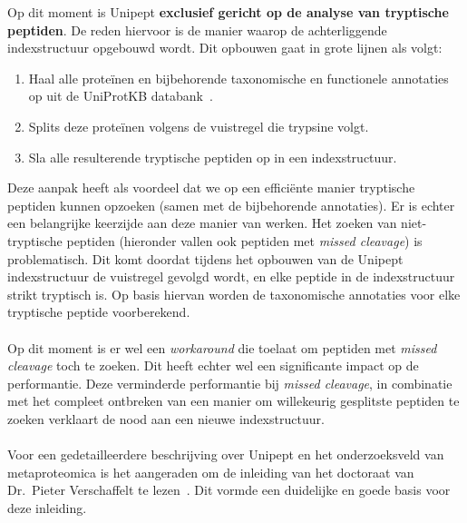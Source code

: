 Op dit moment is Unipept \textbf{exclusief gericht op de analyse van tryptische peptiden}.
De reden hiervoor is de manier waarop de achterliggende indexstructuur opgebouwd wordt.
Dit opbouwen gaat in grote lijnen als volgt:

\begin{enumerate}
    \item Haal alle proteïnen en bijbehorende taxonomische en functionele annotaties op uit de UniProtKB databank~\cite{UniprotKB}.
    \item Splits deze proteïnen volgens de vuistregel die trypsine volgt.
    \item Sla alle resulterende tryptische peptiden op in een indexstructuur.
\end{enumerate}

Deze aanpak heeft als voordeel dat we op een efficiënte manier tryptische peptiden kunnen opzoeken (samen met de bijbehorende annotaties).
Er is echter een belangrijke keerzijde aan deze manier van werken.
Het zoeken van niet-tryptische peptiden (hieronder vallen ook peptiden met \textit{missed cleavage}) is problematisch.
Dit komt doordat tijdens het opbouwen van de Unipept indexstructuur de vuistregel gevolgd wordt, en elke peptide in de indexstructuur strikt tryptisch is.
Op basis hiervan worden de taxonomische annotaties voor elke tryptische peptide voorberekend.
\\ \\
Op dit moment is er wel een \textit{workaround} die toelaat om peptiden met \textit{missed cleavage} toch te zoeken.
Dit heeft echter wel een significante impact op de performantie.
Deze verminderde performantie bij \textit{missed cleavage}, in combinatie met het compleet ontbreken van een manier om willekeurig gesplitste peptiden te zoeken verklaart de nood aan een nieuwe indexstructuur.
\\ \\
Voor een gedetailleerdere beschrijving over Unipept en het onderzoeksveld van metaproteomica is het aangeraden om de inleiding van het doctoraat van Dr.~Pieter Verschaffelt te lezen~\cite{phdPieterUnipept}.
Dit vormde een duidelijke en goede basis voor deze inleiding.


